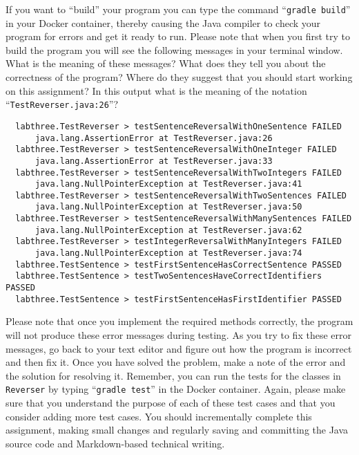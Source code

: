 \documentclass[11pt]{article}
\newcommand{\mainprogram}{\lstinline{Reverser}}
\newcommand{\gradlebuild}{\command{gradle build}}
\newcommand{\gradletest}{\command{gradle test}}
\newcommand{\command}[1]{``\lstinline{#1}''}
\newcommand{\step}[1]{``{#1}''}
\begin{document}
If you want to \step{build} your program you can type the command \gradlebuild{}
in your Docker container, thereby causing the Java compiler to check your
program for errors and get it ready to run. Please note that when you first try
to build the program you will see the following messages in your terminal
window. What is the meaning of these messages? What does they tell you about the
correctness of the program? Where do they suggest that you should start working
on this assignment? In this output what is the meaning of the notation
\command{TestReverser.java:26}?

\vspace*{-.075in}
\begin{verbatim}
  labthree.TestReverser > testSentenceReversalWithOneSentence FAILED
      java.lang.AssertionError at TestReverser.java:26
  labthree.TestReverser > testSentenceReversalWithOneInteger FAILED
      java.lang.AssertionError at TestReverser.java:33
  labthree.TestReverser > testSentenceReversalWithTwoIntegers FAILED
      java.lang.NullPointerException at TestReverser.java:41
  labthree.TestReverser > testSentenceReversalWithTwoSentences FAILED
      java.lang.NullPointerException at TestReverser.java:50
  labthree.TestReverser > testSentenceReversalWithManySentences FAILED
      java.lang.NullPointerException at TestReverser.java:62
  labthree.TestReverser > testIntegerReversalWithManyIntegers FAILED
      java.lang.NullPointerException at TestReverser.java:74
  labthree.TestSentence > testFirstSentenceHasCorrectSentence PASSED
  labthree.TestSentence > testTwoSentencesHaveCorrectIdentifiers PASSED
  labthree.TestSentence > testFirstSentenceHasFirstIdentifier PASSED
\end{verbatim}
\vspace*{-.075in}

Please note that once you implement the required methods correctly, the program
will not produce these error messages during testing. As you try to fix these
error messages, go back to your text editor and figure out how the program is
incorrect and then fix it. Once you have solved the problem, make a note of the
error and the solution for resolving it. Remember, you can run the tests for the
classes in \mainprogram{} by typing \gradletest{} in the Docker container.
Again, please make sure that you understand the purpose of each of these test
cases and that you consider adding more test cases. You should incrementally
complete this assignment, making small changes and regularly saving and
committing the Java source code and Markdown-based technical writing.
\end{document}
